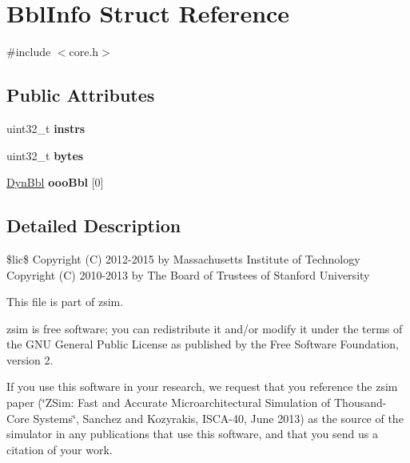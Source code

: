 \hypertarget{structBblInfo}{\section{Bbl\-Info Struct Reference}
\label{structBblInfo}
}


{\ttfamily \#include $<$core.\-h$>$}

\subsection*{Public Attributes}
\begin{DoxyCompactItemize}
\item 
\hypertarget{structBblInfo_a26381f3642e0d5511b7173d734e0a88d}{uint32\-\_\-t {\bfseries instrs}}\label{structBblInfo_a26381f3642e0d5511b7173d734e0a88d}

\item 
\hypertarget{structBblInfo_ae13e66a8604c69c30d5510b417f49908}{uint32\-\_\-t {\bfseries bytes}}\label{structBblInfo_ae13e66a8604c69c30d5510b417f49908}

\item 
\hypertarget{structBblInfo_a933e2aa85267361ec08c2b4583a68dea}{\hyperlink{structDynBbl}{Dyn\-Bbl} {\bfseries ooo\-Bbl} \mbox{[}0\mbox{]}}\label{structBblInfo_a933e2aa85267361ec08c2b4583a68dea}

\end{DoxyCompactItemize}


\subsection{Detailed Description}
\$lic\$ Copyright (C) 2012-\/2015 by Massachusetts Institute of Technology Copyright (C) 2010-\/2013 by The Board of Trustees of Stanford University

This file is part of zsim.

zsim is free software; you can redistribute it and/or modify it under the terms of the G\-N\-U General Public License as published by the Free Software Foundation, version 2.

If you use this software in your research, we request that you reference the zsim paper (\char`\"{}\-Z\-Sim\-: Fast and Accurate Microarchitectural Simulation of
\-Thousand-\/\-Core Systems\char`\"{}, Sanchez and Kozyrakis, I\-S\-C\-A-\/40, June 2013) as the source of the simulator in any publications that use this software, and that you send us a citation of your work.

